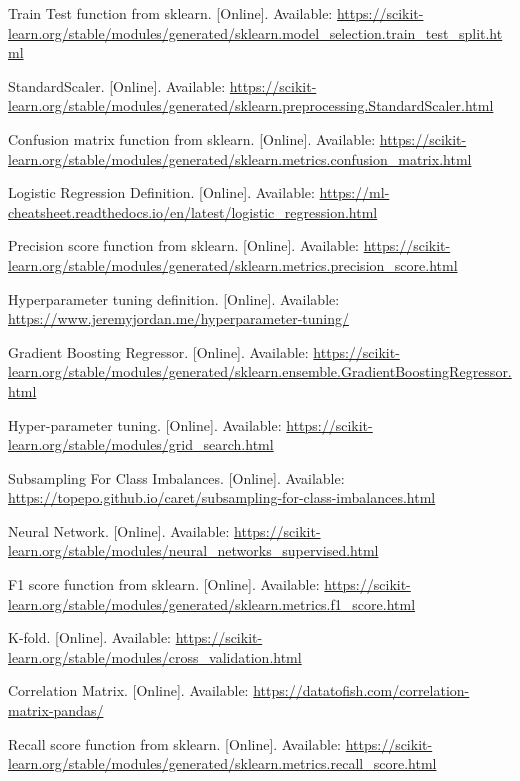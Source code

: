 \documentclass[conference]{IEEEtran}
\begin{document}
\begin{thebibliography}{10}
Train Test function from sklearn. [Online]. Available: \url{https://scikit-learn.org/stable/modules/generated/sklearn.model_selection.train_test_split.html}

StandardScaler. [Online]. Available: \url{https://scikit-learn.org/stable/modules/generated/sklearn.preprocessing.StandardScaler.html}

Confusion matrix function from sklearn. [Online]. Available: \url{https://scikit-learn.org/stable/modules/generated/sklearn.metrics.confusion_matrix.html}

Logistic Regression Definition. [Online]. Available: \url{https://ml-cheatsheet.readthedocs.io/en/latest/logistic_regression.html}

Precision score function from sklearn. [Online]. Available: \url{https://scikit-learn.org/stable/modules/generated/sklearn.metrics.precision_score.html}

Hyperparameter tuning definition. [Online]. Available: \url{https://www.jeremyjordan.me/hyperparameter-tuning/}

Gradient Boosting Regressor. [Online]. Available: \url{https://scikit-learn.org/stable/modules/generated/sklearn.ensemble.GradientBoostingRegressor.html}

Hyper-parameter tuning. [Online]. Available: \url{https://scikit-learn.org/stable/modules/grid_search.html}

Subsampling For Class Imbalances. [Online]. Available: \url{https://topepo.github.io/caret/subsampling-for-class-imbalances.html}

Neural Network. [Online]. Available: \url{https://scikit-learn.org/stable/modules/neural_networks_supervised.html}

F1 score function from sklearn. [Online]. Available: \url{https://scikit-learn.org/stable/modules/generated/sklearn.metrics.f1_score.html}

K-fold. [Online]. Available: \url{https://scikit-learn.org/stable/modules/cross_validation.html}

Correlation Matrix. [Online]. Available: \url{https://datatofish.com/correlation-matrix-pandas/}

Recall score function from sklearn. [Online]. Available: \url{https://scikit-learn.org/stable/modules/generated/sklearn.metrics.recall_score.html}


\end{thebibliography}
\end{document}
